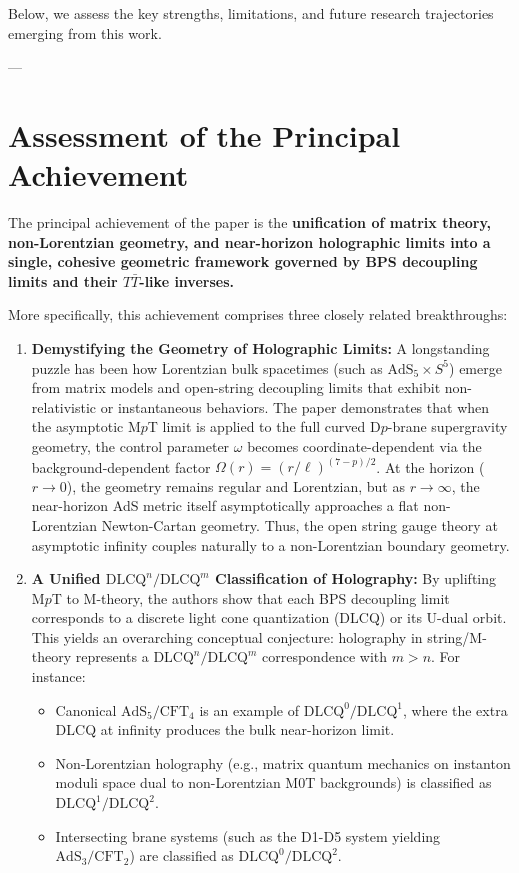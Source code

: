 \documentclass[11pt,a4paper]{article}
\begin{document}
Below, we assess the key strengths, limitations, and future research trajectories emerging from this work.

---

\section{Assessment of the Principal Achievement}
The principal achievement of the paper is the \textbf{unification of matrix theory, non-Lorentzian geometry, and near-horizon holographic limits into a single, cohesive geometric framework governed by BPS decoupling limits and their $T\bar{T}$-like inverses.}

More specifically, this achievement comprises three closely related breakthroughs:
\begin{enumerate}
    \item \textbf{Demystifying the Geometry of Holographic Limits:} 
    A longstanding puzzle has been how Lorentzian bulk spacetimes (such as $\text{AdS}_5 \times S^5$) emerge from matrix models and open-string decoupling limits that exhibit non-relativistic or instantaneous behaviors. The paper demonstrates that when the asymptotic M$p$T limit is applied to the full curved D$p$-brane supergravity geometry, the control parameter $\omega$ becomes coordinate-dependent via the background-dependent factor $\mathbb{\Omega}(r) = (r/\ell)^{(7-p)/2}$. At the horizon ($r \to 0$), the geometry remains regular and Lorentzian, but as $r \to \infty$, the near-horizon AdS metric itself asymptotically approaches a flat non-Lorentzian Newton-Cartan geometry. Thus, the open string gauge theory at asymptotic infinity couples naturally to a non-Lorentzian boundary geometry.

    \item \textbf{A Unified $\text{DLCQ}^n/\text{DLCQ}^m$ Classification of Holography:}
    By uplifting M$p$T to M-theory, the authors show that each BPS decoupling limit corresponds to a discrete light cone quantization (DLCQ) or its U-dual orbit. This yields an overarching conceptual conjecture: holography in string/M-theory represents a $\text{DLCQ}^n/\text{DLCQ}^m$ correspondence with $m > n$. For instance:
    \begin{itemize}
        \item Canonical $\text{AdS}_5/\text{CFT}_4$ is an example of $\text{DLCQ}^0/\text{DLCQ}^1$, where the extra DLCQ at infinity produces the bulk near-horizon limit.
        \item Non-Lorentzian holography (e.g., matrix quantum mechanics on instanton moduli space dual to non-Lorentzian M0T backgrounds) is classified as $\text{DLCQ}^1/\text{DLCQ}^2$.
        \item Intersecting brane systems (such as the D1-D5 system yielding $\text{AdS}_3/\text{CFT}_2$) are classified as $\text{DLCQ}^0/\text{DLCQ}^2$.
    \end{itemize}


\end{enumerate}
\end{document}
